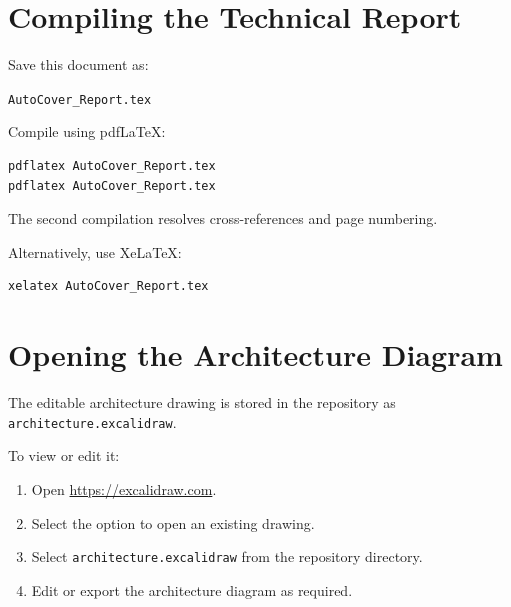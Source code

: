 \documentclass[11pt,a4paper]{article}
\begin{document}

\appendix

\section{Compiling the Technical Report}

Save this document as:

\begin{center}
\texttt{AutoCover\_Report.tex}
\end{center}

Compile using pdfLaTeX:

\begin{lstlisting}[language=bash]
pdflatex AutoCover_Report.tex
pdflatex AutoCover_Report.tex
\end{lstlisting}

The second compilation resolves cross-references and
page numbering.

Alternatively, use XeLaTeX:

\begin{lstlisting}[language=bash]
xelatex AutoCover_Report.tex
\end{lstlisting}

\section{Opening the Architecture Diagram}

The editable architecture drawing is stored in the repository
as \texttt{architecture.excalidraw}.

To view or edit it:

\begin{enumerate}
    \item Open \url{https://excalidraw.com}.
    \item Select the option to open an existing drawing.
    \item Select \texttt{architecture.excalidraw} from the
    repository directory.
    \item Edit or export the architecture diagram as required.
\end{enumerate}
\end{document}
